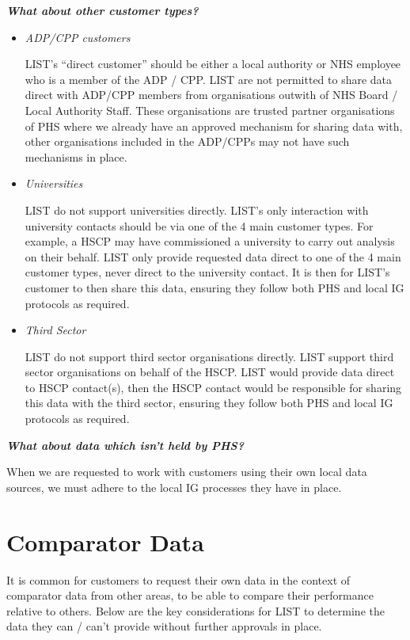 \documentclass[
]{book}
\begin{document}
\emph{\textbf{What about other customer types?}}

\begin{itemize}
\item
  \emph{ADP/CPP customers}

  LIST's ``direct customer'' should be either a local authority or NHS employee who is a member of the ADP / CPP. LIST are not permitted to share data direct with ADP/CPP members from organisations outwith of NHS Board / Local Authority Staff. These organisations are trusted partner organisations of PHS where we already have an approved mechanism for sharing data with, other organisations included in the ADP/CPPs may not have such mechanisms in place.
\item
  \emph{Universities}

  LIST do not support universities directly. LIST's only interaction with university contacts should be via one of the 4 main customer types. For example, a HSCP may have commissioned a university to carry out analysis on their behalf. LIST only provide requested data direct to one of the 4 main customer types, never direct to the university contact. It is then for LIST's customer to then share this data, ensuring they follow both PHS and local IG protocols as required.
\item
  \emph{Third Sector}

  LIST do not support third sector organisations directly. LIST support third sector organisations on behalf of the HSCP. LIST would provide data direct to HSCP contact(s), then the HSCP contact would be responsible for sharing this data with the third sector, ensuring they follow both PHS and local IG protocols as required.
\end{itemize}

\emph{\textbf{What about data which isn't held by PHS?}}

When we are requested to work with customers using their own local data sources, we must adhere to the local IG processes they have in place.

\hypertarget{comparator-data}{%
\section{Comparator Data}\label{comparator-data}}

It is common for customers to request their own data in the context of comparator data from other areas, to be able to compare their performance relative to others. Below are the key considerations for LIST to determine the data they can / can't provide without further approvals in place.
\end{document}
